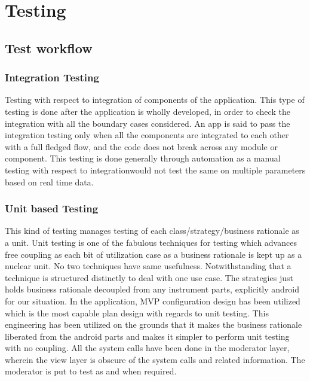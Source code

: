 \documentclass[oneside,12pt]{Classes/VTU}
\begin{document}
	
	\chapter{Testing}
	
	\section{Test workflow}
	\subsection{Integration Testing}
	Testing with respect to integration of components of the application. This type of testing is done after the application is wholly developed, in order to check the integration with all the boundary cases considered. An app is said to pass the integration testing only when all the components are integrated to each other with a full fledged flow, and the code does not break across any module or component. This testing is done generally through automation as a manual testing with respect to integrationwould not test the same on multiple parameters based on real time data.

	\subsection{Unit based Testing}
	This kind of testing manages testing of each class/strategy/business rationale as a unit. Unit testing is one of the fabulous techniques for testing which advances free coupling as each bit of utilization case as a business rationale is kept up as a nuclear unit. No two techniques have same usefulness. Notwithstanding that a technique is structured distinctly to deal with one use case. The strategies just holds business rationale decoupled from any instrument parts, explicitly android for our situation. In the application, MVP configuration design has been utilized which is the most capable plan design with regards to unit testing. This engineering has been utilized on the grounds that it makes the business rationale liberated from the android parts and makes it simpler to perform unit testing with no coupling. All the system calls have been done in the moderator layer, wherein the view layer is obscure of the system calls and related information. The moderator is put to test as and when required.
	
\end{document}
